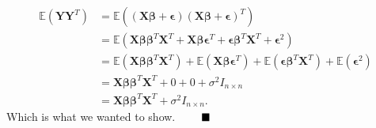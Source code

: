 \documentclass[12pt,
               a4paper,
               article,
               oneside,
               norsk,oldfontcommands]{memoir}
\newcommand{\Q}{ \qquad \hfill \blacksquare}
\begin{document}
\begin{align*}
\mathbb{E}( \mathbf{Y} \mathbf{Y}^T) &= \mathbb{E}\left((\mathbf{X} \boldsymbol{\beta} + \boldsymbol{\epsilon}) (\mathbf{X} \boldsymbol{\beta} + \boldsymbol{\epsilon})^T \right) \\[5pt]
&=\mathbb{E} \left( \mathbf{X} \boldsymbol{\beta} \boldsymbol{\beta}^T \mathbf{X}^T  +  \mathbf{X} \boldsymbol{\beta} \boldsymbol{\epsilon}^T + \boldsymbol{\epsilon}  \boldsymbol{\beta}^T \mathbf{X}^T  + \boldsymbol{\epsilon}^2  \right) \\[5pt] 
&= \mathbb{E} \left( \mathbf{X} \boldsymbol{\beta} \boldsymbol{\beta}^T \mathbf{X}^T \right) +  \mathbb{E} \left(  \mathbf{X} \boldsymbol{\beta} \boldsymbol{\epsilon}^T \right) +  \mathbb{E} \left(  \boldsymbol{\epsilon}  \boldsymbol{\beta}^T \mathbf{X}^T \right) + \mathbb{E} \left(  \boldsymbol{\epsilon}^2  \right) \\[5pt] 
&= \mathbf{X} \boldsymbol{\beta} \boldsymbol{\beta}^T \mathbf{X}^T + 0 + 0 + \sigma^2 I_{n \times n} \\[5pt] 
&=  \mathbf{X} \boldsymbol{\beta} \boldsymbol{\beta}^T \mathbf{X}^T + \sigma^2 I_{n \times n}.
\end{align*}
Which is what we wanted to show. $\Q$
\end{document}
